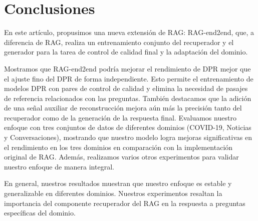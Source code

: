 \documentclass{article}
\begin{document}
\section{Conclusiones}

En este artículo, propusimos una nueva extensión de RAG: RAG-end2end, que, a diferencia de RAG, realiza un entrenamiento conjunto del recuperador y el generador para la tarea de control de calidad final y la adaptación del dominio.

Mostramos que RAG-end2end podría mejorar el rendimiento de DPR mejor que el ajuste fino del DPR de forma independiente. Esto permite el entrenamiento de modelos DPR con pares de control de calidad y elimina la necesidad de pasajes de referencia relacionados con las preguntas. También destacamos que la adición de una señal auxiliar de reconstrucción mejora aún más la precisión tanto del recuperador como de la generación de la respuesta final. Evaluamos nuestro enfoque con tres conjuntos de datos de diferentes dominios (COVID-19, Noticias y Conversaciones), mostrando que nuestro modelo logra mejoras significativas en el rendimiento en los tres dominios en comparación con la implementación original de RAG. Además, realizamos varios otros experimentos para validar nuestro enfoque de manera integral.

En general, nuestros resultados muestran que nuestro enfoque es estable y generalizable en diferentes dominios. Nuestros experimentos resaltan la importancia del componente recuperador del RAG en la respuesta a preguntas específicas del dominio.
\end{document}
